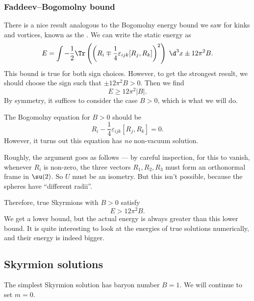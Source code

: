 \documentclass[a4paper]{article}
\begin{document}
\subsubsection*{Faddeev--Bogomolny bound}
There is a nice result analogous to the Bogomolny energy bound we saw for kinks and vortices, known as the . We can write the static energy as
\[
  E = \int - \frac{1}{2} \Tr\left(\left(R_i \mp \frac{1}{4} \varepsilon_{ijk}[R_j, R_k]\right)^2\right)\;\d^3 x \pm 12 \pi^2 B.
\]
This bound is true for both sign choices. However, to get the strongest result, we should choose the sign such that $\pm 12 \pi^2 B > 0$. Then we find
\[
  E \geq 12 \pi^2 |B|.
\]
By symmetry, it suffices to consider the case $B > 0$, which is what we will do.

The Bogomolny equation for $B > 0$ should be
\[
  R_i - \frac{1}{4} \varepsilon_{ijk} [R_j, R_k] = 0.
\]
However, it turns out this equation has \emph{no} non-vacuum solution.

Roughly, the argument goes as follows --- by careful inspection, for this to vanish, whenever $R_i$ is non-zero, the three vectors $R_1, R_2, R_3$ must form an orthonormal frame in $\su(2)$. So $U$ must be an isometry. But this isn't possible, because the spheres have ``different radii''.

Therefore, true Skyrmions with $B > 0$ satisfy
\[
  E > 12 \pi^2 B.
\]
We get a lower bound, but the actual energy is always greater than this lower bound. It is quite interesting to look at the energies of true solutions numerically, and their energy is indeed bigger.

\subsection{Skyrmion solutions}
The simplest Skyrmion solution has baryon number $B = 1$. We will continue to set $m = 0$.
\end{document}
